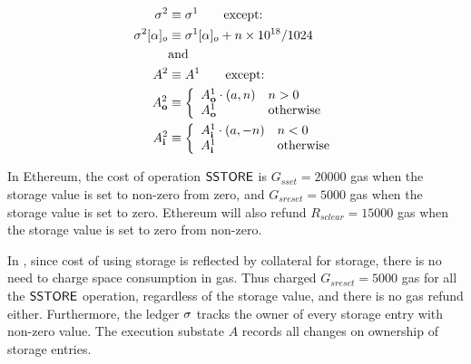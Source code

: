\begin{align}
	\mathbf{\sigma}^2 &\equiv \mathbf{\sigma}^1 \qquad \mbox{except:}\\
	\mathbf{\sigma}^2[\alpha]_o &\equiv \mathbf{\sigma}^1[\alpha]_o+n\times 10^{18}/1024
\\& \text{and} \notag\\
	A^2 &\equiv A^1 \qquad \mbox{except:}\\
	A^2_{\bf o} &\equiv \left\{
		\begin{array}{ll}
			A^1_{\bf o} \cdot (a,n) & n>0 \\
			A^1_{\bf o} & \text{otherwise}
		\end{array}
	\right.\\
	A^2_{\bf i} &\equiv \left\{
		\begin{array}{ll}
			A^1_{\bf i} \cdot (a,-n) & n<0 \\
			A^1_{\bf i} & \text{otherwise}
		\end{array}
	\right.
\end{align}

In Ethereum, the cost of operation $\mathsf{SSTORE}$ is $G_{sset}=20000$ gas when the storage value is set to non-zero from zero,
and  $G_{sreset}=5000$ gas when the storage value is set to zero. 
Ethereum will also refund $R_{sclear}=15000$ gas when the storage value is set to zero from non-zero. 

In {\name}, since cost of using storage is reflected by collateral for storage, there is no need to charge space consumption in gas. 
Thus {\name} charged $G_{sreset}=5000$ gas for all the $\mathsf{SSTORE}$ operation, 
regardless of the storage value,
and there is no gas refund either. 
Furthermore, the {\name} ledger $\mathbf{\sigma}$ tracks the owner of every storage entry with non-zero value. 
The execution substate $A$ records all changes on ownership of storage entries. 

